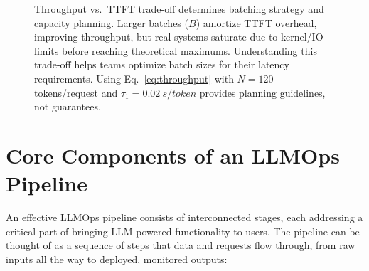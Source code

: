 \begin{figure}[t]
    \centering
    \begin{llmfigbox}
    \end{llmfigbox}
    \caption{Throughput vs.\ TTFT trade-off determines batching strategy and capacity planning. Larger batches ($B$) amortize TTFT overhead, improving throughput, but real systems saturate due to kernel/IO limits before reaching theoretical maximums. Understanding this trade-off helps teams optimize batch sizes for their latency requirements. Using Eq.~\ref{eq:throughput} with $N{=}120$ tokens/request and $\tau_1{=}\SI{0.02}{s/token}$ provides planning guidelines, not guarantees.}
    \label{fig:ch02_ttft_throughput}
\end{figure}

\section{Core Components of an LLMOps Pipeline}
\label{sec:ch2-core-components}
An effective LLMOps pipeline consists of interconnected stages, each addressing a critical part of bringing LLM-powered functionality to users. The pipeline can be thought of as a sequence of steps that data and requests flow through, from raw inputs all the way to deployed, monitored outputs:

